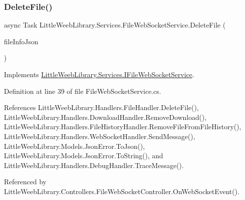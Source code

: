 \subsubsection{\texorpdfstring{Delete\+File()}{DeleteFile()}}
{\footnotesize\ttfamily async Task Little\+Weeb\+Library.\+Services.\+File\+Web\+Socket\+Service.\+Delete\+File (\begin{DoxyParamCaption}\item[{J\+Object}]{file\+Info\+Json }\end{DoxyParamCaption})}



Implements \mbox{\hyperlink{interface_little_weeb_library_1_1_services_1_1_i_file_web_socket_service_a1d612036848a98701a908e3054d8001f}{Little\+Weeb\+Library.\+Services.\+I\+File\+Web\+Socket\+Service}}.



Definition at line 39 of file File\+Web\+Socket\+Service.\+cs.



References Little\+Weeb\+Library.\+Handlers.\+File\+Handler.\+Delete\+File(), Little\+Weeb\+Library.\+Handlers.\+Download\+Handler.\+Remove\+Download(), Little\+Weeb\+Library.\+Handlers.\+File\+History\+Handler.\+Remove\+File\+From\+File\+History(), Little\+Weeb\+Library.\+Handlers.\+Web\+Socket\+Handler.\+Send\+Message(), Little\+Weeb\+Library.\+Models.\+Json\+Error.\+To\+Json(), Little\+Weeb\+Library.\+Models.\+Json\+Error.\+To\+String(), and Little\+Weeb\+Library.\+Handlers.\+Debug\+Handler.\+Trace\+Message().



Referenced by Little\+Weeb\+Library.\+Controllers.\+File\+Web\+Socket\+Controller.\+On\+Web\+Socket\+Event().


